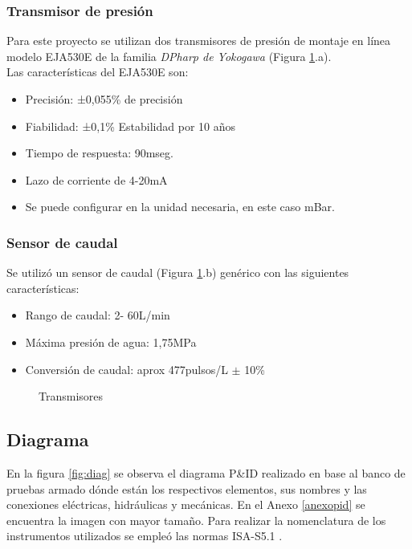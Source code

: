 \subsubsection{Transmisor de presión}
Para este proyecto se utilizan dos transmisores de presión de montaje en línea modelo EJA530E de la familia  \textit{DPharp de Yokogawa} (Figura \ref{fig:transd}.a).\\
Las características del EJA530E son:
\begin{itemize}
	\item Precisión: ±0,055\% de precisión
	\item Fiabilidad: ±0,1\% Estabilidad por 10 años
	\item Tiempo de respuesta: 90mseg.
	\item Lazo de corriente de 4-20mA
	\item Se puede configurar en la unidad necesaria, en este caso mBar.
\end{itemize}


\subsubsection{Sensor de caudal}
Se utilizó un sensor de caudal (Figura \ref{fig:transd}.b) genérico con las siguientes características:
\begin{itemize}
	\item Rango de caudal: 2- 60L/min
	\item Máxima presión de agua: 1,75MPa
	\item Conversión de caudal: aprox 477pulsos/L $\pm$ 10\%
\end{itemize}


\begin{figure}[htbp]
	\centering
	\caption{Transmisores} \label{fig:transd}
\end{figure}





\subsection{Diagrama}
En la figura \ref{fig:diag} se observa el diagrama P\&ID realizado en base al banco de pruebas armado dónde están los respectivos elementos, sus nombres y las conexiones eléctricas, hidráulicas y mecánicas. En el Anexo \ref{anexopid} se encuentra la imagen con mayor tamaño. Para realizar la nomenclatura de los instrumentos utilizados se empleó las normas ISA-S5.1 \cite{ISA}. 

